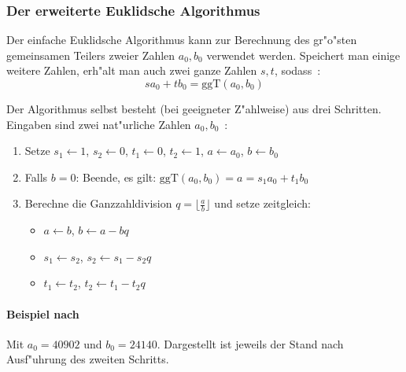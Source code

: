 \documentclass[12pt]{article}
\newcommand{\floor}[1]{\lfloor #1 \rfloor}
\begin{document}
\subsubsection{Der erweiterte Euklidsche Algorithmus}
\label{subsubsec:math:euclid}
Der einfache Euklidsche Algorithmus kann zur Berechnung des gr"o"sten gemeinsamen
Teilers zweier Zahlen $a_0, b_0$ verwendet werden.
Speichert man einige weitere Zahlen, erh"alt man auch zwei ganze Zahlen $s, t$, sodass~\cite{taocp2}:
\begin{equation}\label{eq:euclid} sa_0 + tb_0 = \textrm{ggT}(a_0, b_0) \end{equation}

Der Algorithmus selbst besteht (bei geeigneter Z"ahlweise) aus drei Schritten.
Eingaben sind zwei nat"urliche Zahlen $a_0, b_0$~\cite{taocp2}:
\begin{enumerate}
    \item Setze $s_1 \gets 1$, $s_2 \gets 0$, $t_1 \gets 0$, $t_2 \gets 1$, $a \gets a_0$, $b \gets b_0$
    \item Falls $b = 0$: Beende, es gilt: $\textrm{ggT}(a_0, b_0) = a = s_1 a_0 + t_1 b_0$
    \item Berechne die Ganzzahldivision $q = \floor{\frac{a}{b}}$ und setze zeitgleich:
    \begin{itemize}
        \item $a \gets b$, $b \gets a - bq$
        \item $s_1 \gets s_2$, $s_2 \gets s_1 - s_2 q$
        \item $t_1 \gets t_2$, $t_2 \gets t_1 - t_2 q$
    \end{itemize}
\end{enumerate}

\newpage
\paragraph{Beispiel nach~\cite{taocp2}}
Mit $a_0 = 40902$ und $b_0 = 24140$.
Dargestellt ist jeweils der Stand nach Ausf"uhrung des zweiten Schritts.\\
\end{document}
